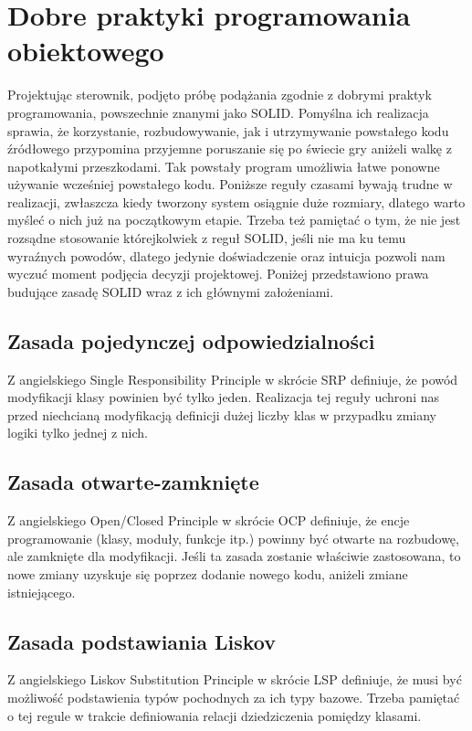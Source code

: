 \chapter{Dobre praktyki programowania obiektowego}
Projektując sterownik, podjęto próbę podążania zgodnie z dobrymi praktyk programowania, powszechnie znanymi jako SOLID.
Pomyślna ich realizacja sprawia, że korzystanie, rozbudowywanie, jak i utrzymywanie powstałego kodu źródłowego przypomina
przyjemne poruszanie się po świecie gry aniżeli walkę z napotkałymi przeszkodami. 
Tak powstały program umożliwia łatwe ponowne używanie wcześniej powstałego kodu.
Poniższe reguły czasami bywają trudne w realizacji, zwłaszcza kiedy tworzony system osiągnie duże rozmiary, dlatego warto myśleć o nich już na początkowym etapie. 
Trzeba też pamiętać o tym, że nie jest rozsądne stosowanie którejkolwiek z reguł SOLID, jeśli nie ma ku temu wyraźnych powodów, dlatego 
jedynie doświadczenie oraz intuicja pozwoli nam wyczuć moment podjęcia decyzji projektowej.
Poniżej przedstawiono prawa budujące zasadę SOLID wraz z ich głównymi założeniami.

\section{Zasada pojedynczej odpowiedzialności}
Z angielskiego Single Responsibility Principle w skrócie SRP definiuje, że powód modyfikacji klasy powinien być tylko jeden\cite{martin2015zwinne}.
Realizacja tej reguły uchroni nas przed niechcianą modyfikacją definicji dużej liczby klas w przypadku zmiany logiki tylko jednej z nich.

\section{Zasada otwarte-zamknięte}
Z angielskiego Open/Closed Principle w skrócie OCP definiuje, że encje programowanie (klasy, moduły, funkcje itp.) powinny być otwarte na rozbudowę, 
ale zamknięte dla modyfikacji\cite{martin2015zwinne}.
Jeśli ta zasada zostanie właściwie zastosowana, to nowe zmiany uzyskuje się poprzez dodanie nowego kodu, aniżeli zmiane istniejącego. 

\section{Zasada podstawiania Liskov}
Z angielskiego Liskov Substitution Principle w skrócie LSP definiuje, że musi być możliwość podstawienia typów pochodnych za ich typy bazowe\cite{martin2015zwinne}.
Trzeba pamiętać o tej regule w trakcie definiowania relacji dziedziczenia pomiędzy klasami.

